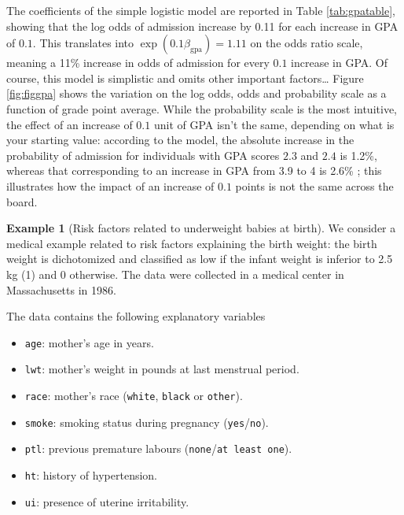 \documentclass[
  11pt,
  letterpaper,
]{book}
\providecommand{\tightlist}{%
  \setlength{\itemsep}{0pt}\setlength{\parskip}{0pt}}
\theoremstyle{definition}
\theoremstyle{definition}
\newtheorem{example}{Example}[chapter]
\theoremstyle{definition}
\theoremstyle{remark}
\begin{document}
The coefficients of the simple logistic model are reported in Table \ref{tab:gpatable}, showing that the log odds of admission increase by 0.11 for each increase in GPA of \(0.1\). This translates into \(\exp(0.1\widehat{\beta}_{\mathrm{gpa}})=1.11\) on the odds ratio scale, meaning a 11\% increase in odds of admission for every \(0.1\) increase in GPA. Of course, this model is simplistic and omits other important factors\ldots{} Figure \ref{fig:figgpa} shows the variation on the log odds, odds and probability scale as a function of grade point average. While the probability scale is the most intuitive, the effect of an increase of \(0.1\) unit of GPA isn't the same, depending on what is your starting value: according to the model, the absolute increase in the probability of admission for individuals with GPA scores \(2.3\) and \(2.4\) is
1.2\%, whereas that corresponding to an increase in GPA from 3.9 to 4 is 2.6\% ; this illustrates how the impact of an increase of \(0.1\) points is not the same across the board.

\begin{example}[Risk factors related to underweight babies at birth]
\protect\hypertarget{exm:birthweightex}{}{\label{exm:birthweightex} {} }We consider a medical example related to risk factors explaining the birth weight: the birth weight is dichotomized and classified as low if the infant weight is inferior to 2.5 kg (1) and 0 otherwise. The data were collected in a medical center in Massachusetts in 1986.
\end{example}

The data contains the following explanatory variables

\begin{itemize}
\tightlist
\item
  \texttt{age}: mother's age in years.
\item
  \texttt{lwt}: mother's weight in pounds at last menstrual period.
\item
  \texttt{race}: mother's race (\texttt{white}, \texttt{black} or \texttt{other}).
\item
  \texttt{smoke}: smoking status during pregnancy (\texttt{yes}/\texttt{no}).
\item
  \texttt{ptl}: previous premature labours (\texttt{none}/\texttt{at\ least\ one}).
\item
  \texttt{ht}: history of hypertension.
\item
  \texttt{ui}: presence of uterine irritability.
\end{itemize}
\end{document}
